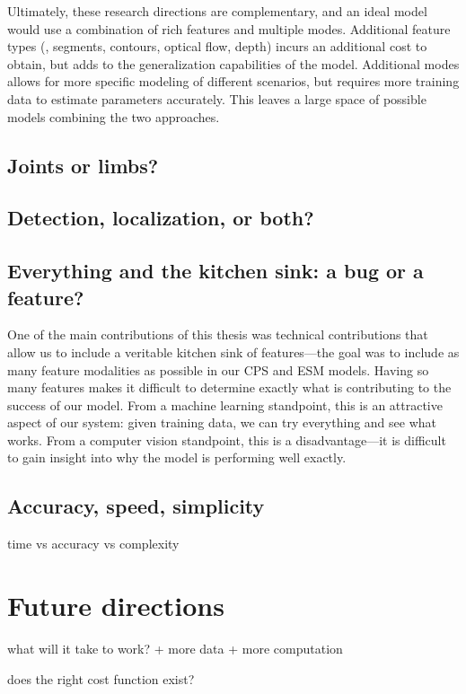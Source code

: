 Ultimately, these research directions are complementary, and an ideal model 
would use a combination of rich features and multiple modes. Additional feature 
types (\eg, segments, contours, optical flow, depth) incurs an additional cost 
to obtain, but adds to the generalization capabilities of the model. Additional 
modes allows for more specific modeling of different scenarios, but requires 
more training data to estimate parameters accurately.  This leaves a large 
space of possible models combining the two approaches.

\section{Joints or limbs?}

\section{Detection, localization, or both?}

\section{Everything and the kitchen sink: a bug or a feature?}
One of the main contributions of this thesis was technical contributions that 
allow us to include a veritable kitchen sink of features---the goal was to 
include as many feature modalities as possible in our CPS and ESM models.  
Having so many features makes it difficult to determine exactly what is 
contributing to the success of our model.  From a machine learning standpoint, 
this is an attractive aspect of our system: given training data, we can try 
everything and see what works.  From a computer vision standpoint, this is a 
disadvantage---it is difficult to gain insight into why the model is performing 
well exactly.


\section{Accuracy, speed, simplicity}
time vs accuracy vs complexity

\chapter{Future directions}

what will it take to work?
  + more data
  + more computation

does the right cost function exist?

